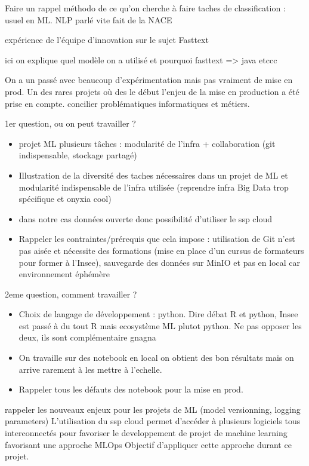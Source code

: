 Faire un rappel méthodo de ce qu'on cherche à faire
taches de classification : usuel en ML. NLP parlé vite fait de la NACE

expérience de l'équipe d'innovation sur le sujet Fasttext

ici on explique quel modèle on a utilisé et pourquoi fasttext => java etccc

On a un passé avec beaucoup d'expérimentation mais pas vraiment de mise en prod. Un des rares projets où des le début l'enjeu de la mise en production a été prise en compte. concilier problématiques
informatiques et métiers.


1er question, ou on peut travailler ? 
\begin{itemize}

    \item projet ML plusieurs tâches : modularité de l'infra + collaboration (git indispensable, stockage partagé)
    \item Illustration de la diversité des taches nécessaires dans un projet de ML et modularité indispensable de l'infra utilisée (reprendre infra Big Data trop spécifique et onyxia cool)
    \item dans notre cas données ouverte donc possibilité d'utiliser le ssp cloud
    \item Rappeler les contraintes/prérequis que cela impose : utilisation de Git n'est pas aisée et nécessite des formations (mise en place d'un cursus de formateurs pour former à l'Insee), sauvegarde des données sur MinIO et pas en  local car environnement éphémère
\end{itemize}

2eme question, comment travailler ?
\begin{itemize}
    \item Choix de langage de développement : python. Dire débat R et python, Insee est passé à du tout R mais ecosystème ML plutot python. Ne pas opposer les deux, ils sont complémentaire gnagna
    \item On travaille sur des notebook en local on obtient des bon résultats mais on arrive rarement à les mettre à l'echelle. 
    \item Rappeler tous les défauts des notebook pour la mise en prod. 
\end{itemize}


rappeler les nouveaux enjeux pour les projets de ML (model versionning, logging parameters) 
L'utilisation du ssp cloud permet d'accéder à plusieurs logiciels tous interconnectés pour favoriser le developpement de projet de machine learning favorisant une approche MLOps
Objectif d'appliquer cette approche durant ce projet.

